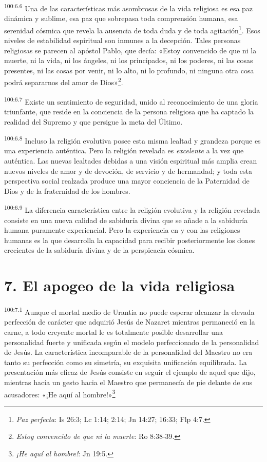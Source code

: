 \par
\textsuperscript{100:6.6} Una de las características más asombrosas de la vida religiosa es esa paz dinámica y sublime, esa paz que sobrepasa toda comprensión humana, esa serenidad cósmica que revela la ausencia de toda duda y de toda agitación\footnote{\textit{Paz perfecta}: Is 26:3; Lc 1:14; 2:14; Jn 14:27; 16:33; Flp 4:7.}. Esos niveles de estabilidad espiritual son inmunes a la decepción. Tales personas religiosas se parecen al apóstol Pablo, que decía: «Estoy convencido de que ni la muerte, ni la vida, ni los ángeles, ni los principados, ni los poderes, ni las cosas presentes, ni las cosas por venir, ni lo alto, ni lo profundo, ni ninguna otra cosa podrá separarnos del amor de Dios»\footnote{\textit{Estoy convencido de que ni la muerte}: Ro 8:38-39.}.

\par
\textsuperscript{100:6.7} Existe un sentimiento de seguridad, unido al reconocimiento de una gloria triunfante, que reside en la conciencia de la persona religiosa que ha captado la realidad del Supremo y que persigue la meta del Último.

\par
\textsuperscript{100:6.8} Incluso la religión evolutiva posee esta misma lealtad y grandeza porque es una experiencia auténtica. Pero la religión revelada es \textit{excelente} a la vez que auténtica. Las nuevas lealtades debidas a una visión espiritual más amplia crean nuevos niveles de amor y de devoción, de servicio y de hermandad; y toda esta perspectiva social realzada produce una mayor conciencia de la Paternidad de Dios y de la fraternidad de los hombres.

\par
\textsuperscript{100:6.9} La diferencia característica entre la religión evolutiva y la religión revelada consiste en una nueva calidad de sabiduría divina que se añade a la sabiduría humana puramente experiencial. Pero la experiencia en y con las religiones humanas es la que desarrolla la capacidad para recibir posteriormente los dones crecientes de la sabiduría divina y de la perspicacia cósmica.

\section*{7. El apogeo de la vida religiosa}
\par
\textsuperscript{100:7.1} Aunque el mortal medio de Urantia no puede esperar alcanzar la elevada perfección de carácter que adquirió Jesús de Nazaret mientras permaneció en la carne, a todo creyente mortal le es totalmente posible desarrollar una personalidad fuerte y unificada según el modelo perfeccionado de la personalidad de Jesús. La característica incomparable de la personalidad del Maestro no era tanto su perfección como su simetría, su exquisita unificación equilibrada. La presentación más eficaz de Jesús consiste en seguir el ejemplo de aquel que dijo, mientras hacía un gesto hacia el Maestro que permanecía de pie delante de sus acusadores: «¡He aquí al hombre!»\footnote{\textit{¡He aquí al hombre!}: Jn 19:5.}

